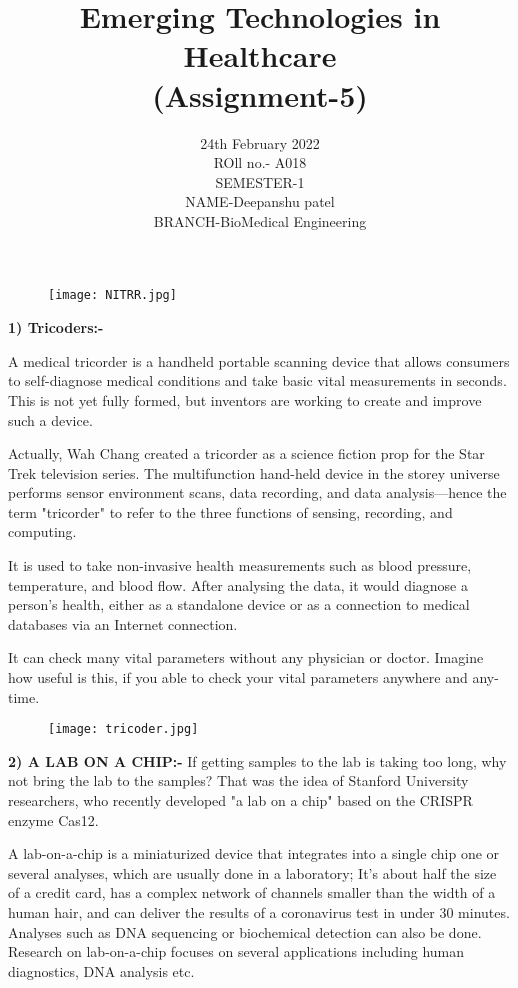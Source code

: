 \documentclass[12pt]{article}
\title{\textbf{ Emerging Technologies in Healthcare }\\(Assignment-5)}
\date{24th February 2022\\ROll no.- A018\\SEMESTER-1\\NAME-Deepanshu patel\\BRANCH-BioMedical Engineering}
\begin{document}
\begin{figure}[h]
\centering
\texttt{[image: NITRR.jpg]}

\maketitle
\end{figure}



\clearpage



\textbf{1) Tricoders:-}

  A medical tricorder is a handheld portable scanning device that allows consumers to self-diagnose medical conditions and take basic vital measurements in seconds. This is not yet fully formed, but inventors are working to create and improve such a device.
  
  Actually, Wah Chang created a tricorder as a science fiction prop for the Star Trek television series. The multifunction hand-held device in the storey universe performs sensor environment scans, data recording, and data analysis—hence the term "tricorder" to refer to the three functions of sensing, recording, and computing.

 It is used to take non-invasive health measurements such as blood pressure, temperature, and blood flow. After analysing the data, it would diagnose a person's health, either as a standalone device or as a connection to medical databases via an Internet connection.

It can check many vital parameters without any physician or doctor. Imagine how useful is this, if you able to check your vital parameters anywhere and any-time.



\begin{figure}[h]
\centering
\texttt{[image: tricoder.jpg]}
\end{figure}


\clearpage

  \textbf{2) A LAB ON A CHIP:-} If getting samples to the lab is taking too long, why not bring the lab to the samples? That was the idea of Stanford University researchers, who recently developed "a lab on a chip" based on the CRISPR enzyme Cas12.
  
   A lab-on-a-chip is a miniaturized device that integrates into a single chip one or several analyses, which are usually done in a laboratory; It's about half the size of a credit card, has a complex network of channels smaller than the width of a human hair, and can deliver the results of a coronavirus test in under 30 minutes. Analyses such as DNA sequencing or biochemical detection can also be done. Research on lab-on-a-chip focuses on several applications including human diagnostics, DNA analysis etc.
\end{document}
